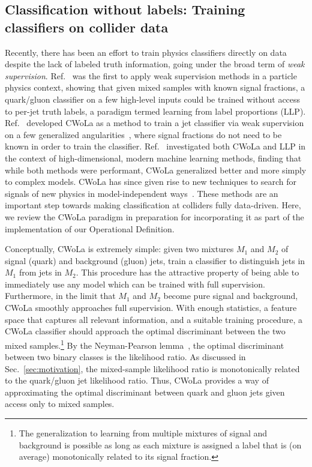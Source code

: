 \documentclass[letterpaper,11pt]{article}
\DeclareRobustCommand{\Sec}[1]{Sec.~\ref{#1}}
\DeclareRobustCommand{\Ref}[1]{Ref.~\cite{#1}}
\begin{document}
\subsection{Classification without labels: Training classifiers on collider data}
\label{sec:cwola}


Recently, there has been an effort to train physics classifiers directly on data despite the lack of labeled truth information, going under the broad term of \emph{weak supervision}.
%
\Ref{Dery:2017fap} was the first to apply weak supervision methods in a particle physics context, showing that given mixed samples with known signal fractions, a quark/gluon classifier on a few high-level inputs could be trained without access to per-jet truth labels, a paradigm termed learning from label proportions (LLP).
%
\Ref{Metodiev:2017vrx} developed CWoLa as a method to train a jet classifier via weak supervision on a few generalized angularities~\cite{Berger:2003iw,Almeida:2008yp,Ellis:2010rwa,Larkoski:2014uqa,Larkoski:2014pca}, where signal fractions do not need to be known in order to train the classifier.
%
\Ref{Komiske:2018oaa} investigated both CWoLa and LLP in the context of high-dimensional, modern machine learning methods, finding that while both methods were performant, CWoLa generalized better and more simply to complex models.
%
CWoLa has since given rise to new techniques to search for signals of new physics in model-independent ways~\cite{Collins:2018epr}.
%
These methods are an important step towards making classification at colliders fully data-driven.
%
Here, we review the CWoLa paradigm in preparation for incorporating it as part of the implementation of our Operational Definition.


Conceptually, CWoLa is extremely simple: given two mixtures $M_1$ and $M_2$ of signal (quark) and background (gluon) jets, train a classifier to distinguish jets in $M_1$ from jets in $M_2$.
%
This procedure has the attractive property of being able to immediately use any model which can be trained with full supervision.
%
Furthermore, in the limit that $M_1$ and $M_2$ become pure signal and background, CWoLa smoothly approaches full supervision.
%
With enough statistics, a feature space that captures all relevant information, and a suitable training procedure, a CWoLa classifier should approach the optimal discriminant between the two mixed samples.\footnote{The generalization to learning from multiple mixtures of signal and background is possible as long as each mixture is assigned a label that is (on average) monotonically related to its signal fraction.}
%
By the Neyman-Pearson lemma~\cite{NPlemma}, the optimal discriminant between two binary classes is the likelihood ratio.
%
As discussed in \Sec{sec:motivation}, the mixed-sample likelihood ratio is monotonically related to the quark/gluon jet likelihood ratio.
%
Thus, CWoLa provides a way of approximating the optimal discriminant between quark and gluon jets given access only to mixed samples.
\end{document}
